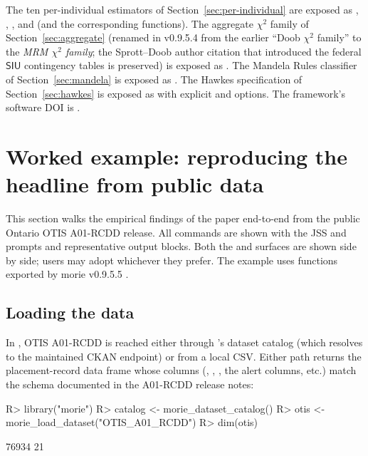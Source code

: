 \documentclass[article,shortnames,nojss]{jss}
\newcommand{\OTIS}{\textsf{OTIS}}
\newcommand{\SIU}{\textsf{SIU}}
\begin{document}
The ten per-individual estimators of
Section~\ref{sec:per-individual} are exposed as
,
,
, and
 (and the corresponding
  functions). The aggregate
$\chi^{2}$ family of Section~\ref{sec:aggregate} (renamed in
v0.9.5.4 from the earlier ``Doob $\chi^{2}$ family'' to the
\emph{MRM $\chi^{2}$ family}; the Sprott--Doob author citation
that introduced the federal $\SIU$ contingency tables is
preserved) is exposed as .
The Mandela Rules classifier of Section~\ref{sec:mandela} is
exposed as . The Hawkes
specification of Section~\ref{sec:hawkes} is exposed as
 with explicit  and  options. The framework's software
DOI is \citet{Ruhela2026MorieR}.

\section{Worked example: reproducing the headline from public data}
\label{sec:worked-example}

This section walks the empirical findings of the paper end-to-end
from the public Ontario \OTIS{} A01-RCDD release.  All commands
are shown with the JSS  and \code{>>>} prompts and
representative output blocks.  Both the  and
 surfaces are shown side by side; users may
adopt whichever they prefer.  The example uses functions
exported by morie v0.9.5.5
\citep{Ruhela2026MorieR, Ruhela2026MoriePy}.

\subsection{Loading the data}

In , OTIS A01-RCDD is reached either through 's
dataset catalog (which resolves to the maintained CKAN endpoint)
or from a local CSV.  Either path returns the placement-record
data frame whose columns
(,
, ,
the alert columns, etc.) match the schema documented in the
A01-RCDD release notes:

\begin{CodeChunk}
\begin{CodeInput}
R> library("morie")
R> catalog <- morie_dataset_catalog()
R> otis    <- morie_load_dataset("OTIS_A01_RCDD")
R> dim(otis)
\end{CodeInput}
\begin{CodeOutput}
[1] 76934    21
\end{CodeOutput}
\end{CodeChunk}
\end{document}
